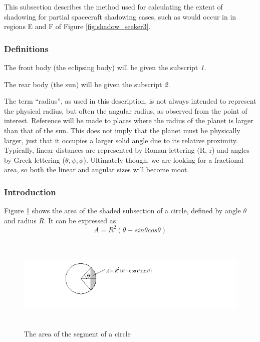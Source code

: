    This subsection describes the method used for calculating the extent of
   shadowing for partial spacecraft shadowing cases, such as would occur in
   in regions E and F of Figure \ref{fig:shadow_seeker3}.

   \bigskip
   \subsubsection{Definitions}


   The front body (the eclipsing body) will be given the subscript
   \textit{1.}

   The rear body (the sun) will be given the subscript \textit{2.}

   The term ``radius'', as used in this description, is not always intended
   to represent the physical radius, but often
   the angular radius, as observed from the point of interest. Reference
   will be made to places where the radius of the planet is larger than
   that of the sun. This does not imply that the planet must be
   physically larger, just that it occupies a larger solid angle due to
   its relative proximity.
   Typically, linear distances are represented by Roman lettering (R, r) and
   angles by Greek lettering ($\theta, \psi, \phi$).
   Ultimately though, we are looking for a fractional area, so both the linear
   and angular sizes will become moot.

   \subsubsection{Introduction}

   Figure \ref{fig:shadow_calc1} shows the area of the shaded subsection of a
   circle, defined by angle  $\theta $ and radius \textit{R}.  It can be
   expressed as
   \begin{equation*}
    A = R^2 (\theta - sin \theta cos \theta)
   \end{equation*}


   \begin{figure}[!ht]
   \begin{center}
    \includegraphics[height=45mm]{figs/shadow/shadow_calculator_fig1.jpg}
    \end{center}
    \caption{The area of the segment of a circle}
    \label{fig:shadow_calc1}
   \end{figure}

